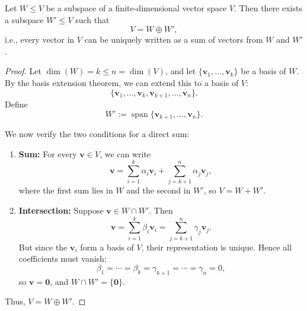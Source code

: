 \begin{proposition}[Complementation]\label{prop:complementation}
Let \( W \leq V \) be a subspace of a finite-dimensional vector space \( V \). Then there exists a subspace \( W' \leq V \) such that
\[
V = W \oplus W',
\]
i.e., every vector in \( V \) can be uniquely written as a sum of vectors from \( W \) and \( W' \).
\end{proposition}

\begin{proof}
Let \( \dim(W) = k \leq n = \dim(V) \), and let \( \{ \mathbf{v}_1, \ldots, \mathbf{v}_k \} \) be a basis of \( W \).
By the basis extension theorem, we can extend this to a basis of \( V \):
\[
\{ \mathbf{v}_1, \ldots, \mathbf{v}_k, \mathbf{v}_{k+1}, \ldots, \mathbf{v}_n \}.
\]
Define
\[
W' := \operatorname{span} \{ \mathbf{v}_{k+1}, \ldots, \mathbf{v}_n \}.
\]

We now verify the two conditions for a direct sum:

\begin{enumerate}
\item \textbf{Sum:} For every \( \mathbf{v} \in V \), we can write
\[
\mathbf{v} = \sum_{i=1}^{k} \alpha_i \mathbf{v}_i + \sum_{j=k+1}^{n} \alpha_j \mathbf{v}_j,
\]
where the first sum lies in \( W \) and the second in \( W' \), so \( V = W + W' \).

\item \textbf{Intersection:} Suppose \( \mathbf{v} \in W \cap W' \). Then
\[
\mathbf{v} = \sum_{i=1}^{k} \beta_i \mathbf{v}_i = \sum_{j=k+1}^{n} \gamma_j \mathbf{v}_j.
\]
But since the \( \mathbf{v}_i \) form a basis of \( V \), their representation is unique. Hence all coefficients must vanish:
\[
\beta_1 = \cdots = \beta_k = \gamma_{k+1} = \cdots = \gamma_n = 0,
\]
so \( \mathbf{v} = \mathbf{0} \), and \( W \cap W' = \{ \mathbf{0} \} \).
\end{enumerate}

Thus, \( V = W \oplus W' \).
\end{proof}
